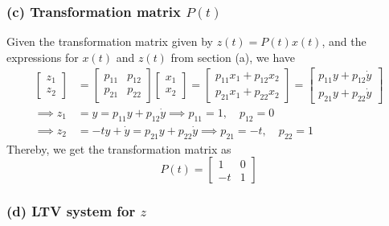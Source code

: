 \subsubsection*{(c) Transformation matrix \( P(t) \)}

Given the transformation matrix given by \( z(t) = P(t)x(t) \), and the expressions for \( x(t) \) and \( z(t) \) from section (a), we have
\begin{align*}
    \begin{bmatrix}
        z_1 \\
        z_2
    \end{bmatrix}
     & =
    \begin{bmatrix}
        p_{11} & p_{12} \\
        p_{21} & p_{22}
    \end{bmatrix}
    \begin{bmatrix}
        x_1 \\
        x_2
    \end{bmatrix}
    =
    \begin{bmatrix}
        p_{11} x_1 + p_{12} x_2 \\
        p_{21} x_1 + p_{22} x_2
    \end{bmatrix}
    =
    \begin{bmatrix}
        p_{11} y + p_{12} \dot y \\
        p_{21} y + p_{22} \dot y
    \end{bmatrix}
    \\
    \implies
    z_1
     & =
    y
    =
    p_{11} y + p_{12} \dot y
    \implies
    p_{11} = 1, \quad p_{12} = 0
    \\
    \implies
    z_2
     & =
    -t y + \dot y
    =
    p_{21} y + p_{22} \dot y
    \implies
    p_{21} = -t, \quad p_{22} = 1
\end{align*}
Thereby, we get the transformation matrix as
\begin{equation*}
    \boxed{
        P(t)
        =
        \begin{bmatrix}
            1  & 0 \\
            -t & 1
        \end{bmatrix}
    }
\end{equation*}

\clearpage
\subsubsection*{(d) LTV system for \( z \)}

